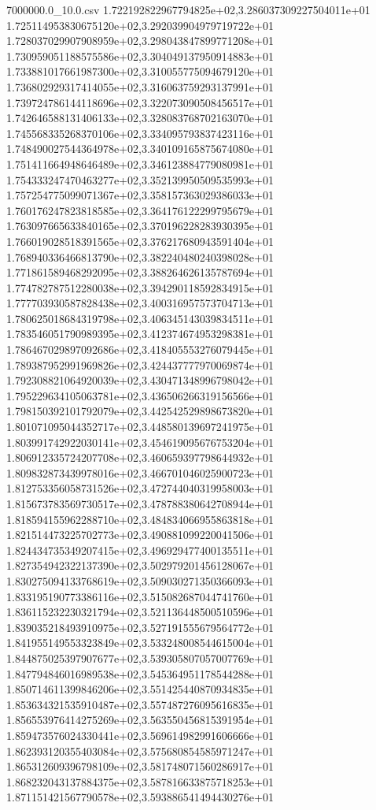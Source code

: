 \begin{filecontents*}{7000000.0_10.0.csv}
1.722192822967794825e+02,3.286037309227504011e+01
1.725114953830675120e+02,3.292039904979719722e+01
1.728037029907908959e+02,3.298043847899771208e+01
1.730959051188575586e+02,3.304049137950914883e+01
1.733881017661987300e+02,3.310055775094679120e+01
1.736802929317414055e+02,3.316063759293137991e+01
1.739724786144118696e+02,3.322073090508456517e+01
1.742646588131406133e+02,3.328083768702163070e+01
1.745568335268370106e+02,3.334095793837423116e+01
1.748490027544364978e+02,3.340109165875674080e+01
1.751411664948646489e+02,3.346123884779080981e+01
1.754333247470463277e+02,3.352139950509535993e+01
1.757254775099071367e+02,3.358157363029386033e+01
1.760176247823818585e+02,3.364176122299795679e+01
1.763097665633840165e+02,3.370196228283930395e+01
1.766019028518391565e+02,3.376217680943591404e+01
1.768940336466813790e+02,3.382240480240398028e+01
1.771861589468292095e+02,3.388264626135787694e+01
1.774782787512280038e+02,3.394290118592834915e+01
1.777703930587828438e+02,3.400316957573704713e+01
1.780625018684319798e+02,3.406345143039834511e+01
1.783546051790989395e+02,3.412374674953298381e+01
1.786467029897092686e+02,3.418405553276079445e+01
1.789387952991969826e+02,3.424437777970069874e+01
1.792308821064920039e+02,3.430471348996798042e+01
1.795229634105063781e+02,3.436506266319156566e+01
1.798150392101792079e+02,3.442542529898673820e+01
1.801071095044352717e+02,3.448580139697241975e+01
1.803991742922030141e+02,3.454619095676753204e+01
1.806912335724207708e+02,3.460659397798644932e+01
1.809832873439978016e+02,3.466701046025900723e+01
1.812753356058731526e+02,3.472744040319958003e+01
1.815673783569730517e+02,3.478788380642708944e+01
1.818594155962288710e+02,3.484834066955863818e+01
1.821514473225702773e+02,3.490881099220041506e+01
1.824434735349207415e+02,3.496929477400135511e+01
1.827354942322137390e+02,3.502979201456128067e+01
1.830275094133768619e+02,3.509030271350366093e+01
1.833195190773386116e+02,3.515082687044741760e+01
1.836115232230321794e+02,3.521136448500510596e+01
1.839035218493910975e+02,3.527191555679564772e+01
1.841955149553323849e+02,3.533248008544615004e+01
1.844875025397907677e+02,3.539305807057007769e+01
1.847794846016989538e+02,3.545364951178544288e+01
1.850714611399846206e+02,3.551425440870934835e+01
1.853634321535910487e+02,3.557487276095616835e+01
1.856553976414275269e+02,3.563550456815391954e+01
1.859473576024330441e+02,3.569614982991606666e+01
1.862393120355403084e+02,3.575680854585971247e+01
1.865312609396798109e+02,3.581748071560286917e+01
1.868232043137884375e+02,3.587816633875718253e+01
1.871151421567790578e+02,3.593886541494430276e+01

\end{filecontents*}
